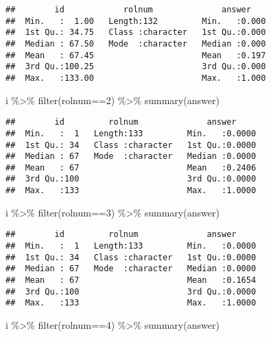 \documentclass[
]{article}
\newenvironment{Shaded}{\begin{snugshade}}{\end{snugshade}}
\newcommand{\DecValTok}[1]{\textcolor[rgb]{0.00,0.00,0.81}{#1}}
\newcommand{\FunctionTok}[1]{\textcolor[rgb]{0.00,0.00,0.00}{#1}}
\newcommand{\NormalTok}[1]{#1}
\newcommand{\SpecialCharTok}[1]{\textcolor[rgb]{0.00,0.00,0.00}{#1}}
\begin{document}
\begin{enumerate}
\begin{verbatim}
##        id            rolnum              answer     
##  Min.   :  1.00   Length:132         Min.   :0.000  
##  1st Qu.: 34.75   Class :character   1st Qu.:0.000  
##  Median : 67.50   Mode  :character   Median :0.000  
##  Mean   : 67.45                      Mean   :0.197  
##  3rd Qu.:100.25                      3rd Qu.:0.000  
##  Max.   :133.00                      Max.   :1.000
\end{verbatim}

\begin{Shaded}
\begin{Highlighting}[]
\NormalTok{i }\SpecialCharTok{\%\textgreater{}\%} \FunctionTok{filter}\NormalTok{(rolnum}\SpecialCharTok{==}\DecValTok{2}\NormalTok{) }\SpecialCharTok{\%\textgreater{}\%} \FunctionTok{summary}\NormalTok{(answer)}
\end{Highlighting}
\end{Shaded}

\begin{verbatim}
##        id         rolnum              answer      
##  Min.   :  1   Length:133         Min.   :0.0000  
##  1st Qu.: 34   Class :character   1st Qu.:0.0000  
##  Median : 67   Mode  :character   Median :0.0000  
##  Mean   : 67                      Mean   :0.2406  
##  3rd Qu.:100                      3rd Qu.:0.0000  
##  Max.   :133                      Max.   :1.0000
\end{verbatim}

\begin{Shaded}
\begin{Highlighting}[]
\NormalTok{i }\SpecialCharTok{\%\textgreater{}\%} \FunctionTok{filter}\NormalTok{(rolnum}\SpecialCharTok{==}\DecValTok{3}\NormalTok{) }\SpecialCharTok{\%\textgreater{}\%} \FunctionTok{summary}\NormalTok{(answer)}
\end{Highlighting}
\end{Shaded}

\begin{verbatim}
##        id         rolnum              answer      
##  Min.   :  1   Length:133         Min.   :0.0000  
##  1st Qu.: 34   Class :character   1st Qu.:0.0000  
##  Median : 67   Mode  :character   Median :0.0000  
##  Mean   : 67                      Mean   :0.1654  
##  3rd Qu.:100                      3rd Qu.:0.0000  
##  Max.   :133                      Max.   :1.0000
\end{verbatim}

\begin{Shaded}
\begin{Highlighting}[]
\NormalTok{i }\SpecialCharTok{\%\textgreater{}\%} \FunctionTok{filter}\NormalTok{(rolnum}\SpecialCharTok{==}\DecValTok{4}\NormalTok{) }\SpecialCharTok{\%\textgreater{}\%} \FunctionTok{summary}\NormalTok{(answer)}
\end{Highlighting}
\end{Shaded}


\end{enumerate}
\end{document}
